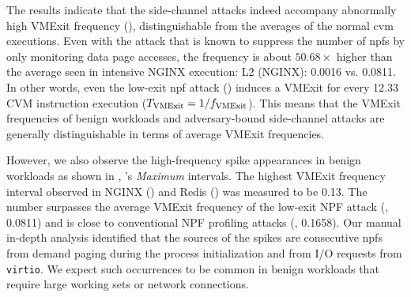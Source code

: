 

The results indicate that the side-channel attacks indeed accompany abnormally high VMExit frequency (\freqvmexit), distinguishable from the averages of the normal \gls{cvm} executions.
Even with the attack \llenpf that is known to suppress the number of \glspl{npf} by only monitoring data page accesses, the frequency is about $50.68\times$ higher than the average seen in intensive NGINX execution: L2 (NGINX): 0.0016 vs. 0.0811.
In other words, even the low-exit \gls{npf} attack (\llenpf) induces a VMExit for every 12.33 CVM instruction execution ($T_{\text{VMExit}} = 1/f_{\text{VMExit}}$).
This means that the VMExit frequencies of benign workloads and adversary-bound side-channel attacks are generally distinguishable in terms of average VMExit frequencies.


However, we also observe the high-frequency spike appearances in benign workloads as shown in \lnginx, \lredis's \emph{Maximum} \freqvmexit intervals.
The highest VMExit frequency interval observed in NGINX (\lnginx) and Redis (\lredis) was measured to be {0.13}.
The number surpasses the average VMExit frequency of the low-exit NPF attack (\llenpf, {0.0811}) and is close to conventional NPF profiling attacks (\lnpf, {0.1658}).
Our manual in-depth analysis identified that the sources of the spikes are consecutive \glspl{npf} from demand paging during the process initialization and from I/O requests from \texttt{virtio}.
We expect such occurrences to be common in benign workloads that require large working sets or network connections.

